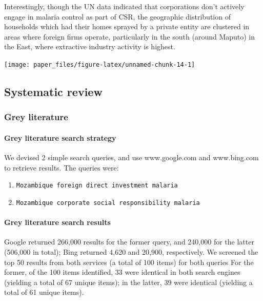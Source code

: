 \documentclass[]{elsarticle} %
\providecommand{\tightlist}{%
  \setlength{\itemsep}{0pt}\setlength{\parskip}{0pt}}
\begin{document}
Interestingly, though the UN data indicated that corporations don't
actively engage in malaria control as part of CSR, the geographic
distribution of households which had their homes sprayed by a private
entity are clustered in areas where foreign firms operate, particularly
in the south (around Maputo) in the East, where extractive industry
activity is highest.

\begin{center}\texttt{[image: paper\_files/figure-latex/unnamed-chunk-14-1]} \end{center}

\subsection{Systematic review}\label{systematic-review-1}

\subsubsection{Grey literature}\label{grey-literature-1}

\paragraph{Grey literature search
strategy}\label{grey-literature-search-strategy}

We devised 2 simple search queries, and use www.google.com and
www.bing.com to retrieve results. The queries were:

\begin{enumerate}
\def\labelenumi{\arabic{enumi}.}
\tightlist
\item
  \texttt{Mozambique\ foreign\ direct\ investment\ malaria}
\item
  \texttt{Mozambique\ corporate\ social\ responsibility\ malaria}
\end{enumerate}

\paragraph{Grey literature search
results}\label{grey-literature-search-results}

Google returned 266,000 results for the former query, and 240,000 for
the latter (506,000 in total); Bing returned 4,620 and 20,900,
respectively. We screened the top 50 results from both services (a total
of 100 items) for both queries For the former, of the 100 items
identified, 33 were identical in both search engines (yielding a total
of 67 unique items); in the latter, 39 were identical (yielding a total
of 61 unique items).
\end{document}
